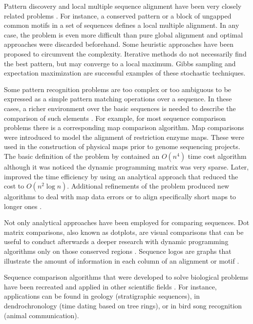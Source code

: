 Pattern discovery and local multiple sequence alignment have been very closely related problems 
\citep{brazma:1998a}. For instance, a conserved pattern or a block of ungapped common motifs in a set of 
sequences defines a local multiple alignment. In any case, the problem is even more difficult than pure 
global alignment and optimal approaches were discarded beforehand. Some heuristic approaches have been 
proposed to circumvent the complexity. Iterative methods do not necessarily find the best pattern, but may
converge to a local maximum. Gibbs sampling \citep{lawrence:1993a} and expectation maximization
\citep{bailey:1994a} are successful examples of these stochastic techniques.

Some pattern recognition problems are too complex or too ambiguous to be expressed as a simple pattern
matching operations over a sequence. In these cases, a richer environment over the basic sequences is 
needed to describe the comparison of such elements \citep{knight:1995a}. For example, for most sequence
comparison problems there is a corresponding map comparison algorithm. Map comparisons were introduced
to model the alignment of restriction enzyme maps. These were used in the construction of physical maps 
prior to genome sequencing projects. The basic definition of the problem by \citet{waterman:1984c} 
contained an $O(n^4)$ time cost algorithm although it was noticed the dynamic programming matrix was 
very sparse. Later, \citet{myers:1992a} improved the time efficiency by using an analytical approach
that reduced the cost to $O(n^2 \log{n})$. Additional refinements of the problem produced new algorithms 
to deal with map data errors \citep{huang:1992a} or to align specifically short maps to longer ones 
\citep{miller:1990a}.

Not only analytical approaches have been employed for comparing sequences. Dot matrix comparisons, also
known as dotplots, are visual comparisons that can be useful to conduct afterwards a deeper research with dynamic 
programming algorithms only on those conserved regions \citep{gibbs:1970a}. Sequence logos are graphs
that illustrate the amount of information in each column of an alignment or motif \citep{schneider:1990a}. 

Sequence comparison algorithms that were developed to solve biological problems have been recreated and 
applied in other scientific fields \citep{sankoff:1983a}. For instance, applications can be found in geology 
(stratigraphic sequences), in dendrochronology (time dating based on tree rings), or in bird song recognition 
(animal communication). 


